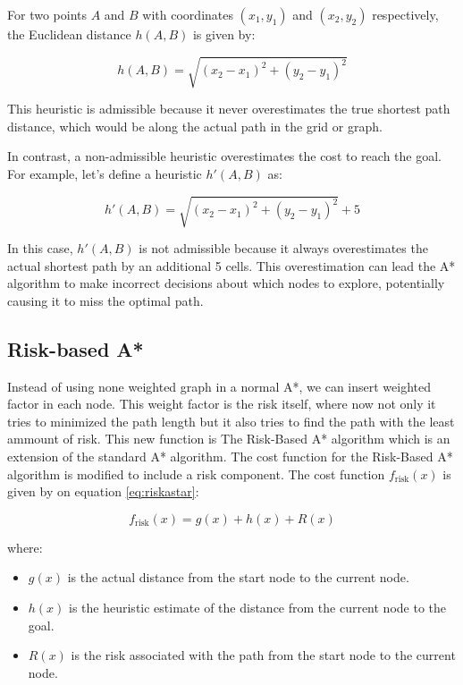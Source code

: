\documentclass[12pt]{report}
\begin{document}
        For two points \(A\) and \(B\) with coordinates \((x_1, y_1)\) and \((x_2, y_2)\) respectively, the Euclidean
        distance \(h(A, B)\) is given by:

        \begin{equation}
            h(A, B) = \sqrt{(x_2 - x_1)^2 + (y_2 - y_1)^2}
        \end{equation}
            
        This heuristic is admissible because it never overestimates the true shortest path distance, which would be
        along the actual path in the grid or graph.
            
        In contrast, a non-admissible heuristic overestimates the cost to reach the goal. For example, let’s define a
        heuristic \(h'(A, B)\) as:
            
        \begin{equation}
            h'(A, B) = \sqrt{(x_2 - x_1)^2 + (y_2 - y_1)^2} + 5
        \end{equation}
            
        In this case, \(h'(A, B)\) is not admissible because it always overestimates the actual shortest path by an
        additional 5 cells. This overestimation can lead the A* algorithm to make incorrect decisions about which nodes
        to explore, potentially causing it to miss the optimal path.

        \subsection{Risk-based A*}
        Instead of using none weighted graph in a normal A*, we can insert weighted factor in each node. This weight
        factor is the risk itself, where now not only it tries to minimized the path length but it also tries to find
        the path with the least ammount of risk. This new function is The Risk-Based A* algorithm which is an extension
        of the standard A* algorithm. The cost function for the Risk-Based A* algorithm is modified to include a risk
        component. The cost function \( f_{\text{risk}}(x) \) is given by on equation \ref{eq:riskastar}:

        \begin{equation}\label{eq:riskastar}
        f_{\text{risk}}(x) = g(x) + h(x) + R(x)
        \end{equation}
        
        where:
        \begin{itemize}
          \item \( g(x) \) is the actual distance from the start node to the current node.
          \item \( h(x) \) is the heuristic estimate of the distance from the current node to the goal.
          \item \( R(x) \) is the risk associated with the path from the start node to the current node.
        \end{itemize}
        
\end{document}
